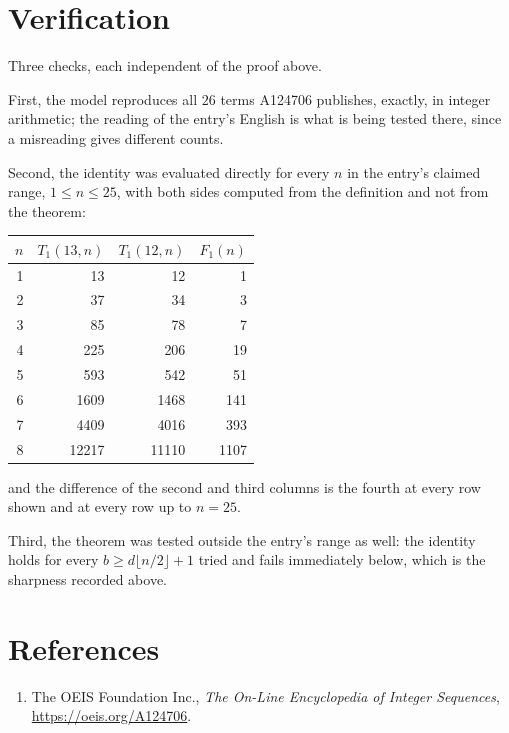 \documentclass[11pt,a4paper]{article}
\theoremstyle{plain}
\theoremstyle{definition}
\begin{document}
\section{Verification}

Three checks, each independent of the proof above.

First, the model reproduces all $26$ terms A124706 publishes, exactly, in integer
arithmetic; the reading of the entry's English is what is being tested there, since a
misreading gives different counts.

Second, the identity was evaluated directly for every $n$ in the entry's claimed range,
$1\le n\le25$, with both sides computed from the definition and not from the theorem:

\begin{center}
\begin{tabular}{rrrr}
$n$ & $T_{1}(13,n)$ & $T_{1}(12,n)$ & $F_{1}(n)$ \\ \hline
1 & 13 & 12 & 1 \\
2 & 37 & 34 & 3 \\
3 & 85 & 78 & 7 \\
4 & 225 & 206 & 19 \\
5 & 593 & 542 & 51 \\
6 & 1609 & 1468 & 141 \\
7 & 4409 & 4016 & 393 \\
8 & 12217 & 11110 & 1107 \\
\end{tabular}
\end{center}

\noindent and the difference of the second and third columns is the fourth at every row shown
and at every row up to $n=25$.

Third, the theorem was tested outside the entry's range as well: the identity holds for every
$b\ge d\lfloor n/2\rfloor+1$ tried and fails immediately below, which is the sharpness recorded
above.

\section*{References}
\begin{enumerate}
\item The OEIS Foundation Inc., \emph{The On-Line Encyclopedia of Integer Sequences},
\url{https://oeis.org/A124706}.
\end{enumerate}
\end{document}
